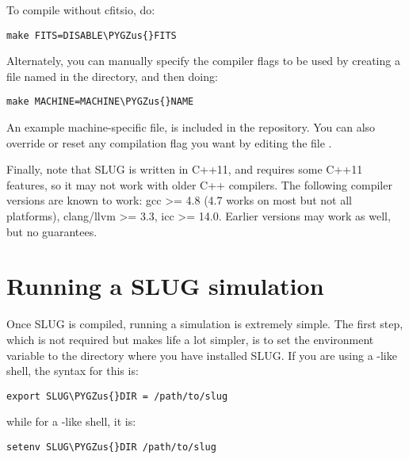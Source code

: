 \documentclass[letterpaper,10pt,english]{sphinxmanual}
\def\PYGZus{\char`\_}
\begin{document}
To compile without cfitsio, do:

\begin{Verbatim}[commandchars=\\\{\}]
make FITS=DISABLE\PYGZus{}FITS
\end{Verbatim}

Alternately, you can manually specify the compiler flags to be used by creating a file named  in the  directory, and then doing:

\begin{Verbatim}[commandchars=\\\{\}]
make MACHINE=MACHINE\PYGZus{}NAME
\end{Verbatim}

An example machine-specific file,  is included in the repository. You can also override or reset any compilation flag you want by editing the file .

Finally, note that SLUG is written in C++11, and requires some C++11 features, so it may not work with older C++ compilers. The following compiler versions are known to work: gcc \textgreater{}= 4.8 (4.7 works on most but not all platforms), clang/llvm \textgreater{}= 3.3, icc \textgreater{}= 14.0. Earlier versions may work as well, but no guarantees.


\chapter{Running a SLUG simulation}
\label{running::doc}\label{running:running-a-slug-simulation}
Once SLUG is compiled, running a simulation is extremely simple. The first step, which is not required but makes life a lot simpler, is to set the environment variable  to the directory where you have installed SLUG. If you are using a -like shell, the syntax for this is:

\begin{Verbatim}[commandchars=\\\{\}]
export SLUG\PYGZus{}DIR = /path/to/slug
\end{Verbatim}

while for a -like shell, it is:

\begin{Verbatim}[commandchars=\\\{\}]
setenv SLUG\PYGZus{}DIR /path/to/slug
\end{Verbatim}
\end{document}
